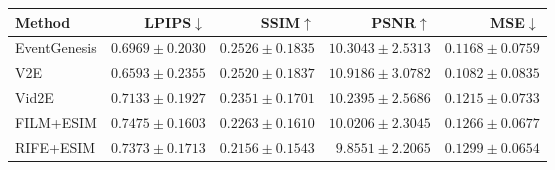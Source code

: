 \begin{tabular}{lrrrr}
\toprule
Method & LPIPS$\downarrow$ & SSIM$\uparrow$ & PSNR$\uparrow$ & MSE$\downarrow$ \\
\midrule
EventGenesis & $0.6969\pm 0.2030$ & $0.2526\pm 0.1835$ & $10.3043\pm 2.5313$ & $0.1168\pm 0.0759$ \\
V2E & $0.6593\pm 0.2355$ & $0.2520\pm 0.1837$ & $10.9186\pm 3.0782$ & $0.1082\pm 0.0835$ \\
Vid2E & $0.7133\pm 0.1927$ & $0.2351\pm 0.1701$ & $10.2395\pm 2.5686$ & $0.1215\pm 0.0733$ \\
FILM+ESIM & $0.7475\pm 0.1603$ & $0.2263\pm 0.1610$ & $10.0206\pm 2.3045$ & $0.1266\pm 0.0677$ \\
RIFE+ESIM & $0.7373\pm 0.1713$ & $0.2156\pm 0.1543$ & $9.8551\pm 2.2065$ & $0.1299\pm 0.0654$ \\
\bottomrule
\end{tabular}
